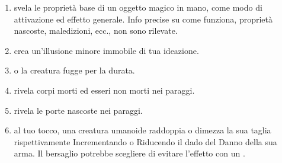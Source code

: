 \documentclass[itdr]{subfiles}
\begin{document}
\begin{enumerate}
	\item {} svela le proprietà base di un oggetto magico in mano, come modo di attivazione ed effetto generale. Info precise su come funziona, proprietà nascoste, maledizioni, ecc., non sono rilevate.
	\item {} crea un’\mbox{illusione} minore immobile di tua ideazione.
	\item {}  o la creatura fugge per la durata.
	\item {} rivela corpi morti ed esseri non morti nei paraggi.
	\item {} rivela le porte nascoste nei paraggi.
	\item {} al tuo tocco, una creatura umanoide raddoppia o dimezza la sua taglia rispettivamente Incrementando o Riducendo il dado del Danno della sua arma. Il bersaglio potrebbe scegliere di evitare l’effetto con un .

\vfill
\break


\end{enumerate}
\end{document}
